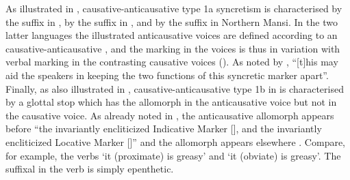 As illustrated in , causative-anticausative type 1a syncretism is characterised by the suffix  in , by the suffix  in , and by the suffix  in Northern Mansi. In the two latter languages the illustrated anticausative voices are defined according to an  causative-anticausative , and the marking in the voices is thus in variation with verbal marking in the contrasting causative voices (). As noted by \cite[244]{zuniga:kittila:2019}, “[t]his may aid the speakers in keeping the two functions of this syncretic marker apart”. Finally, as also illustrated in , causative-anticausative type 1b in  is characterised by a glottal stop  which has the allomorph  in the anticausative voice but not in the causative voice. As already noted in , the anticausative allomorph  appears before “the invariantly encliticized Indicative Marker [], and the invariantly encliticized Locative Marker []” and the allomorph  appears elsewhere \citep[336]{morgan:1991}. Compare, for example, the verbs  ‘it (proximate) is greasy’ and  ‘it (obviate) is greasy’. The suffixal  in the verb  is simply epenthetic.

